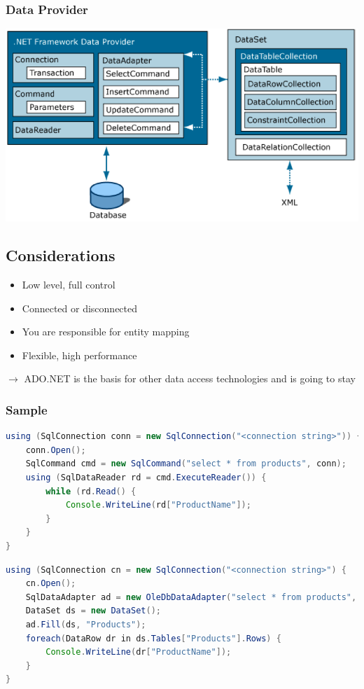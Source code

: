 \documentclass[10pt]{article}
\begin{document}
\subsubsection{Data Provider}
\begin{center}
	\includegraphics[scale=0.4]{ado_data_provider.png}
\end{center}
\subsection{Considerations}
\begin{itemize}
	\item Low level, full control
	\item Connected or disconnected
	\item You are responsible for entity mapping
	\item Flexible, high performance
\end{itemize}
$\rightarrow$ ADO.NET is the basis for other data access technologies and is going to stay
\subsubsection{Sample}
\begin{lstlisting}[language=Java, caption=Sample:, style=JavaStyle]
using (SqlConnection conn = new SqlConnection("<connection string>")) {
	conn.Open();
	SqlCommand cmd = new SqlCommand("select * from products", conn);
	using (SqlDataReader rd = cmd.ExecuteReader()) {
		while (rd.Read() {
			Console.WriteLine(rd["ProductName"]);
		}
	}
}
\end{lstlisting}
\begin{lstlisting}[language=Java, caption=DataSet Sample:, style=JavaStyle]
using (SqlConnection cn = new SqlConnection("<connection string>") {
	cn.Open();
	SqlDataAdapter ad = new OleDbDataAdapter("select * from products", cn); 
	DataSet ds = new DataSet();
	ad.Fill(ds, "Products");
	foreach(DataRow dr in ds.Tables["Products"].Rows) {
		Console.WriteLine(dr["ProductName"]);
	}
}
\end{lstlisting}
\end{document}
